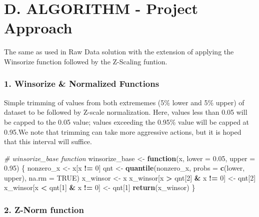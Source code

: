 \documentclass[
]{article}
\newenvironment{Shaded}{\begin{snugshade}}{\end{snugshade}}
\newcommand{\AttributeTok}[1]{\textcolor[rgb]{0.13,0.29,0.53}{#1}}
\newcommand{\CommentTok}[1]{\textcolor[rgb]{0.56,0.35,0.01}{\textit{#1}}}
\newcommand{\ConstantTok}[1]{\textcolor[rgb]{0.56,0.35,0.01}{#1}}
\newcommand{\ControlFlowTok}[1]{\textcolor[rgb]{0.13,0.29,0.53}{\textbf{#1}}}
\newcommand{\DecValTok}[1]{\textcolor[rgb]{0.00,0.00,0.81}{#1}}
\newcommand{\FloatTok}[1]{\textcolor[rgb]{0.00,0.00,0.81}{#1}}
\newcommand{\FunctionTok}[1]{\textcolor[rgb]{0.13,0.29,0.53}{\textbf{#1}}}
\newcommand{\NormalTok}[1]{#1}
\newcommand{\OtherTok}[1]{\textcolor[rgb]{0.56,0.35,0.01}{#1}}
\newcommand{\SpecialCharTok}[1]{\textcolor[rgb]{0.81,0.36,0.00}{\textbf{#1}}}
\begin{document}
\section{D. ALGORITHM - Project
Approach}\label{d.-algorithm---project-approach}

The same as used in Raw Data solution with the extension of applying the
Winsorize function followed by the Z-Scaling funtion.

\subsubsection{1. Winsorize \& Normalized
Functions}\label{winsorize-normalized-functions}

Simple trimming of values from both extrememes (5\% lower and 5\% upper)
of dataset to be followed by Z-scale normalization. Here, values less
than 0.05 will be capped to the 0.05 value; values exceeding the 0.95\%
value will be capped at 0.95.We note that trimming can take more
aggressive actions, but it is hoped that this interval will suffice.

\begin{Shaded}
\begin{Highlighting}[]
\CommentTok{\# winsorize\_base function}
\NormalTok{winsorize\_base }\OtherTok{\textless{}{-}} \ControlFlowTok{function}\NormalTok{(x, }\AttributeTok{lower =} \FloatTok{0.05}\NormalTok{, }\AttributeTok{upper =} \FloatTok{0.95}\NormalTok{) \{}
\NormalTok{  nonzero\_x }\OtherTok{\textless{}{-}}\NormalTok{ x[x }\SpecialCharTok{!=} \DecValTok{0}\NormalTok{]}
\NormalTok{  qnt }\OtherTok{\textless{}{-}} \FunctionTok{quantile}\NormalTok{(nonzero\_x, }\AttributeTok{probs =} \FunctionTok{c}\NormalTok{(lower, upper), }\AttributeTok{na.rm =} \ConstantTok{TRUE}\NormalTok{)}
\NormalTok{  x\_winsor }\OtherTok{\textless{}{-}}\NormalTok{ x}
\NormalTok{  x\_winsor[x }\SpecialCharTok{\textgreater{}}\NormalTok{ qnt[}\DecValTok{2}\NormalTok{] }\SpecialCharTok{\&}\NormalTok{ x }\SpecialCharTok{!=} \DecValTok{0}\NormalTok{] }\OtherTok{\textless{}{-}}\NormalTok{ qnt[}\DecValTok{2}\NormalTok{]}
\NormalTok{  x\_winsor[x }\SpecialCharTok{\textless{}}\NormalTok{ qnt[}\DecValTok{1}\NormalTok{] }\SpecialCharTok{\&}\NormalTok{ x }\SpecialCharTok{!=} \DecValTok{0}\NormalTok{] }\OtherTok{\textless{}{-}}\NormalTok{ qnt[}\DecValTok{1}\NormalTok{]}
  \FunctionTok{return}\NormalTok{(x\_winsor)}
\NormalTok{\}}
\end{Highlighting}
\end{Shaded}

\subsubsection{2. Z-Norm function}\label{z-norm-function}
\end{document}
